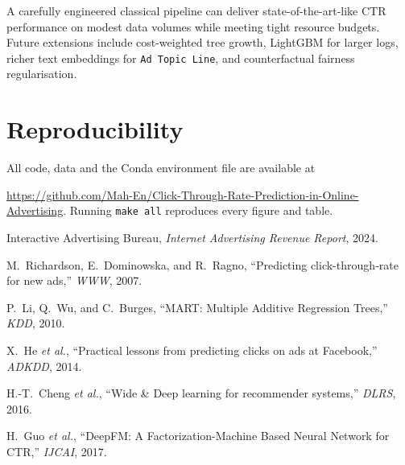 \documentclass[12pt,a4paper]{article}
\begin{document}
A carefully engineered classical pipeline can deliver
state-of-the-art-like CTR performance on modest data volumes while
meeting tight resource budgets.  Future extensions include
cost-weighted tree growth, LightGBM for larger logs, richer text
embeddings for \texttt{Ad Topic Line}, and counterfactual fairness
regularisation.

\section*{Reproducibility}

All code, data and the Conda environment file are available at  

\url{https://github.com/Mah-En/Click-Through-Rate-Prediction-in-Online-Advertising}.  
Running \texttt{make all} reproduces every figure and table.

\begin{thebibliography}{9}
Interactive Advertising Bureau,
\textit{Internet Advertising Revenue Report}, 2024.

M.~Richardson, E.~Dominowska, and R.~Ragno,
“Predicting click-through‐rate for new ads,” \textit{WWW}, 2007.

P.~Li, Q.~Wu, and C.~Burges,
“MART: Multiple Additive Regression Trees,” \textit{KDD}, 2010.

X.~He \textit{et al.},
“Practical lessons from predicting clicks on ads at Facebook,”
\textit{ADKDD}, 2014.

H.-T.~Cheng \textit{et al.},
“Wide \& Deep learning for recommender systems,” \textit{DLRS}, 2016.

H.~Guo \textit{et al.},
“DeepFM: A Factorization-Machine Based Neural Network for CTR,”
\textit{IJCAI}, 2017.
\end{thebibliography}
\end{document}
